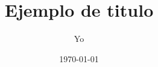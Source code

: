 \title{Ejemplo de titulo}
\author{Yo}
\date{\today}

\makeatletter
\newcommand\mymaketitle{%
  \begin{titlepage}
    \null\vfil\vskip 40\p@
    \begin{center}
      {\LARGE \@title \par}
      \vskip 2.5em
      {\large \lineskip .75em \@author \par}
      \vskip 1.5em
      {\large \@date \par}
      \vskip 2.5em
        \graphicspath{  }               %
            \texttt{[image: figures/complutense.png]}
    \end{center}\par
    \@thanks
    \vfil\null
  \end{titlepage}
}
\makeatother
